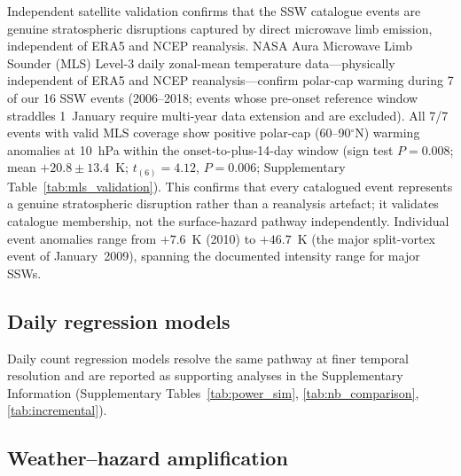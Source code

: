 \documentclass[11pt,letterpaper]{article}
\begin{document}
Independent satellite validation confirms that the SSW catalogue events are genuine stratospheric disruptions captured by direct microwave limb emission, independent of ERA5 and NCEP reanalysis. NASA Aura Microwave Limb Sounder (MLS) Level-3 daily zonal-mean temperature data\cite{Waters2006}---physically independent of ERA5 and NCEP reanalysis---confirm polar-cap warming during 7 of our 16 SSW events (2006--2018; events whose pre-onset reference window straddles 1~January require multi-year data extension and are excluded). All 7/7 events with valid MLS coverage show positive polar-cap (60--90$^\circ$N) warming anomalies at 10~hPa within the onset-to-plus-14-day window (sign test $P = 0.008$; mean $+20.8 \pm 13.4$~K; $t_{(6)} = 4.12$, $P = 0.006$; Supplementary Table~\ref{tab:mls_validation}). This confirms that every catalogued event represents a genuine stratospheric disruption rather than a reanalysis artefact; it validates catalogue membership, not the surface-hazard pathway independently. Individual event anomalies range from $+7.6$~K (2010) to $+46.7$~K (the major split-vortex event of January~2009\cite{Labitzke2009}), spanning the documented intensity range for major SSWs\cite{Butler2017}.

\subsection*{Daily regression models}

Daily count regression models resolve the same pathway at finer temporal resolution and are reported as supporting analyses in the Supplementary Information (Supplementary Tables~\ref{tab:power_sim}, \ref{tab:nb_comparison}, \ref{tab:incremental}).

\subsection*{Weather--hazard amplification}
\end{document}
